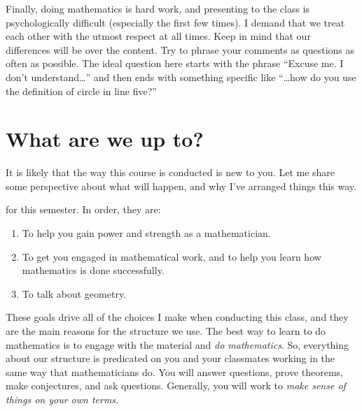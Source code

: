 \documentclass{tufte-handout}
\theoremstyle{definition}
\begin{document}
Finally, doing mathematics is hard work, and presenting to the class is psychologically difficult (especially the first few times).
I demand that we treat each other with the utmost respect at all times.
Keep in mind that our differences will be over the content.
Try to phrase your comments as questions as often as possible.
The ideal question here starts with the phrase ``Excuse me. I don't understand\dots'' and then ends with something specific like ``\dots how do you use the definition of circle in line five?''


\section*{What are we up to?}

It is likely that the way this course is conducted is new to you.
Let me share some perspective about what will happen, and why I've arranged things this way.

 for this semester. In order, they are:
\begin{enumerate}
\item To help you gain power and strength as a mathematician.

\item To get you engaged in mathematical work, and to help you learn how mathematics is done successfully.

\item To talk about geometry.
\end{enumerate}

These goals drive all of the choices I make when conducting this class, and they are the main reasons for the structure we use.
The best way to learn to do mathematics is to engage with the material and \emph{do mathematics}.
So, everything about our structure is predicated on you and your classmates working in the same way that mathematicians do.
You will answer questions, prove theorems, make conjectures, and ask questions.
Generally, you will work to \emph{make sense of things on your own terms.} 
\end{document}
